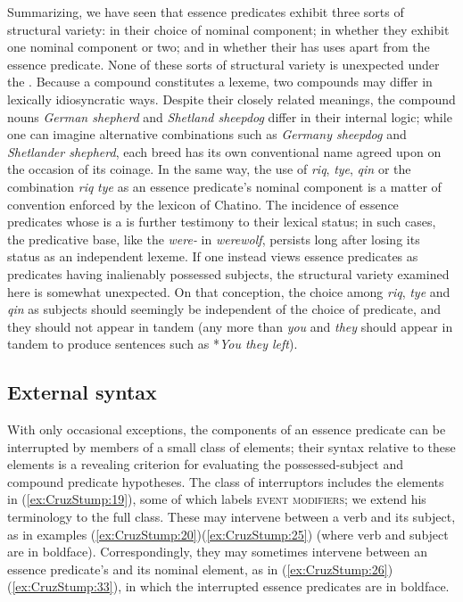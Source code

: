 \documentclass[output=paper]{langsci/langscibook}
\begin{document}
Summarizing, we have seen that essence predicates exhibit three sorts of structural variety:  in their choice of nominal component; in whether they exhibit one nominal component or two; and in whether their  has uses apart from the essence predicate.  None of these sorts of structural variety is unexpected under the .  Because a compound constitutes a lexeme, two compounds may differ in lexically idiosyncratic ways. Despite their closely related meanings, the  compound nouns \textit{German
 shepherd} and \textit{Shetland sheepdog} differ in their internal logic; while one can imagine alternative combinations such as \textit{Germany sheepdog} and \textit{Shetlander shepherd}, each breed has its own conventional name agreed upon on the occasion of its coinage.  In the same way, the use of \emph{riq}, \emph{tye}, \emph{qin} or the combination \emph{riq} \emph{tye} as an essence predicate's nominal component is a matter of convention enforced by the lexicon of Chatino.  The incidence of essence predicates whose  is a  is further testimony to their lexical status; in such cases, the predicative base, like the \textit{were-} in   \textit{werewolf}, persists long after losing its status as an independent lexeme.  
If one instead views essence predicates as predicates having inalienably possessed
subjects, the structural variety examined here is somewhat unexpected.  On that conception, the choice among \emph{riq}, \emph{tye} and \emph{qin} as subjects should seemingly be independent of the choice of predicate,  and they should not appear in tandem (any more than \textit{you} and \textit{they} should appear in tandem to produce sentences such as *\textit{You they left}).

\subsection{External syntax}



With only occasional exceptions, the components of an essence predicate can be
interrupted by members of a small class of elements; their syntax relative to these elements is a revealing criterion for evaluating the possessed-subject and compound predicate hypotheses.  The class of interruptors includes the elements in (\ref{ex:CruzStump:19}), some of which \cite[10]{Rasch02} labels \textsc{event
modifiers}; we extend his terminology to the full class. These may intervene between a verb and its
subject, as in examples (\ref{ex:CruzStump:20})\textendash (\ref{ex:CruzStump:25}) (where verb and subject are in boldface).  Correspondingly, they may sometimes intervene between an essence predicate's  and its nominal element, as in (\ref{ex:CruzStump:26})\textendash(\ref{ex:CruzStump:33}), in which the interrupted essence predicates are in boldface.
\end{document}
